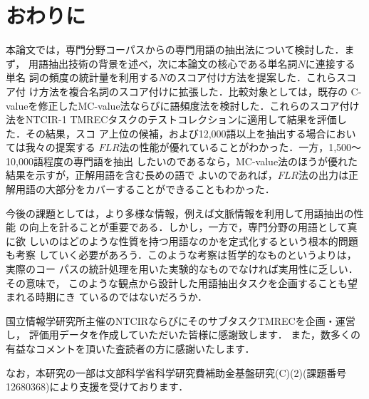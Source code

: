 \section{おわりに}

本論文では，専門分野コーパスからの専門用語の抽出法について検討した．まず，
用語抽出技術の背景を述べ，次に本論文の核心である単名詞$N$に連接する単名
詞の頻度の統計量を利用する$N$のスコア付け方法を提案した．これらスコア付
け方法を複合名詞のスコア付けに拡張した．比較対象としては，既存の
C-valueを修正したMC-value法ならびに語頻度法を検討した．これらのスコア付け法をNTCIR-1
TMRECタスクのテストコレクションに適用して結果を評価した．その結果，スコ
ア上位の候補，および12,000語以上を抽出する場合においては我々の提案する
$FLR$法の性能が優れていることがわかった．一方，1,500〜10,000語程度の専門語を抽出
したいのであるなら，MC-value法のほうが優れた結果を示すが，正解用語を含む長めの語で
よいのであれば，$FLR$法の出力は正解用語の大部分をカバーすることができることもわかった．

今後の課題としては，より多様な情報，例えば文脈情報を利用して用語抽出の性能
の向上を計ることが重要である．しかし，一方で，専門分野の用語として真に欲
しいのはどのような性質を持つ用語なのかを定式化するという根本的問題も考察
していく必要があろう．このような考察は哲学的なものというよりは，実際のコー
パスの統計処理を用いた実験的なものでなければ実用性に乏しい．その意味で，
このような観点から設計した用語抽出タスクを企画することも望まれる時期にき
ているのではないだろうか．

\acknowledgment

国立情報学研究所主催のNTCIRならびにそのサブタスクTMRECを企画・運営し，
評価用データを作成していただいた皆様に感謝致します．
また，数多くの有益なコメントを頂いた査読者の方に感謝いたします．

なお，本研究の一部は文部科学省科学研究費補助金基盤研究(C)(2)(課題番号12680368)により支援を受けております．





